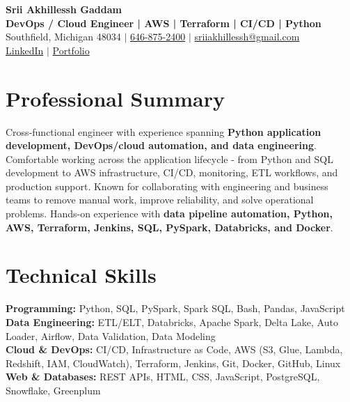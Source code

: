 \documentclass[letterpaper,10pt]{article}
\begin{document}
\fontsize{9.35pt}{10.45pt}\selectfont

\begin{center}
    {\LARGE \textbf{Srii Akhillessh Gaddam}} \\[-1pt]
    \textbf{DevOps / Cloud Engineer | AWS | Terraform | CI/CD | Python} \\[2pt]
    Southfield, Michigan 48034 $|$
    \href{tel:6468752400}{646-875-2400} $|$
    \href{mailto:sriiakhillessh@gmail.com}{sriiakhillessh@gmail.com} \\[1pt]
    \href{https://www.linkedin.com/in/srii-akhiilessh-gaddam-b48668191/}{LinkedIn} $|$
    \href{https://sriiakhillesshg.github.io/portfolio/}{Portfolio}
\end{center}
\vspace{-8pt}

\section{Professional Summary}
\small{Cross-functional engineer with experience spanning \textbf{Python application development, DevOps/cloud automation, and data engineering}. Comfortable working across the application lifecycle - from Python and SQL development to AWS infrastructure, CI/CD, monitoring, ETL workflows, and production support. Known for collaborating with engineering and business teams to remove manual work, improve reliability, and solve operational problems. Hands-on experience with \textbf{data pipeline automation, Python, AWS, Terraform, Jenkins, SQL, PySpark, Databricks, and Docker}.}

\section{Technical Skills}
\small{
\textbf{Programming:} Python, SQL, PySpark, Spark SQL, Bash, Pandas, JavaScript \\
\textbf{Data Engineering:} ETL/ELT, Databricks, Apache Spark, Delta Lake, Auto Loader, Airflow, Data Validation, Data Modeling \\
\textbf{Cloud \& DevOps:} CI/CD, Infrastructure as Code, AWS (S3, Glue, Lambda, Redshift, IAM, CloudWatch), Terraform, Jenkins, Git, Docker, GitHub, Linux \\
\textbf{Web \& Databases:} REST APIs, HTML, CSS, JavaScript, PostgreSQL, Snowflake, Greenplum
}
\end{document}

